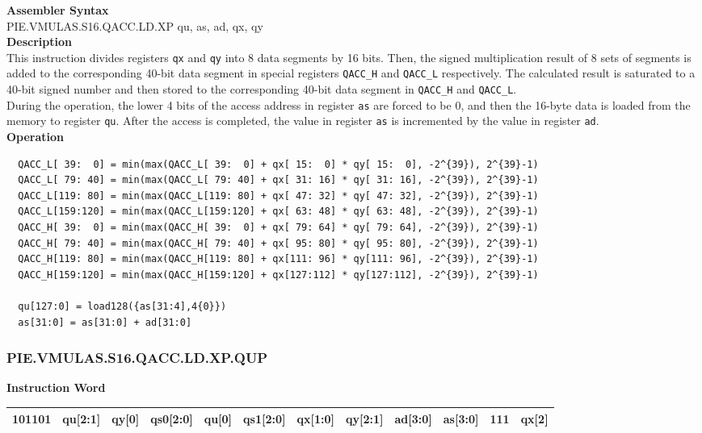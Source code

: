 \textbf{Assembler Syntax} \\
PIE.VMULAS.S16.QACC.LD.XP qu, as, ad, qx, qy \\
\textbf{Description} \\
This instruction divides registers \lstinline{qx} and \lstinline{qy} into 8 data segments by 16 bits. Then, the signed multiplication result of 8 sets of segments is added to the corresponding 40-bit data segment in special registers \lstinline{QACC_H} and \lstinline{QACC_L} respectively. The calculated result is saturated to a 40-bit signed number and then stored to the corresponding 40-bit data segment in \lstinline{QACC_H} and \lstinline{QACC_L}.\\
During the operation, the lower 4 bits of the access address in register \lstinline{as} are forced to be 0, and then the 16-byte data is loaded from the memory to register \lstinline{qu}. After the access is completed, the value in register \lstinline{as} is incremented by the value in register \lstinline{ad}.\\
\textbf{Operation}
\begin{lstlisting}
  QACC_L[ 39:  0] = min(max(QACC_L[ 39:  0] + qx[ 15:  0] * qy[ 15:  0], -2^{39}), 2^{39}-1)
  QACC_L[ 79: 40] = min(max(QACC_L[ 79: 40] + qx[ 31: 16] * qy[ 31: 16], -2^{39}), 2^{39}-1)
  QACC_L[119: 80] = min(max(QACC_L[119: 80] + qx[ 47: 32] * qy[ 47: 32], -2^{39}), 2^{39}-1)
  QACC_L[159:120] = min(max(QACC_L[159:120] + qx[ 63: 48] * qy[ 63: 48], -2^{39}), 2^{39}-1)
  QACC_H[ 39:  0] = min(max(QACC_H[ 39:  0] + qx[ 79: 64] * qy[ 79: 64], -2^{39}), 2^{39}-1)
  QACC_H[ 79: 40] = min(max(QACC_H[ 79: 40] + qx[ 95: 80] * qy[ 95: 80], -2^{39}), 2^{39}-1)
  QACC_H[119: 80] = min(max(QACC_H[119: 80] + qx[111: 96] * qy[111: 96], -2^{39}), 2^{39}-1)
  QACC_H[159:120] = min(max(QACC_H[159:120] + qx[127:112] * qy[127:112], -2^{39}), 2^{39}-1)

  qu[127:0] = load128({as[31:4],4{0}})
  as[31:0] = as[31:0] + ad[31:0]
\end{lstlisting}

\newpage
\subsubsection{PIE.VMULAS.S16.QACC.LD.XP.QUP}\label{instruction:PIEVMULASS16QACCLDXPQUP}
\setlength\tabcolsep{6pt}
\textbf{Instruction Word} \\
\begin{tabular}{|c|c|c|c|c|c|c|c|c|c|c|c|}
	\hline
	101101 & qu[2:1] & qy[0] & qs0[2:0] & qu[0] & qs1[2:0] & qx[1:0] & qy[2:1] & ad[3:0] & as[3:0] & 111 & qx[2] \\
	\hline
\end{tabular}

